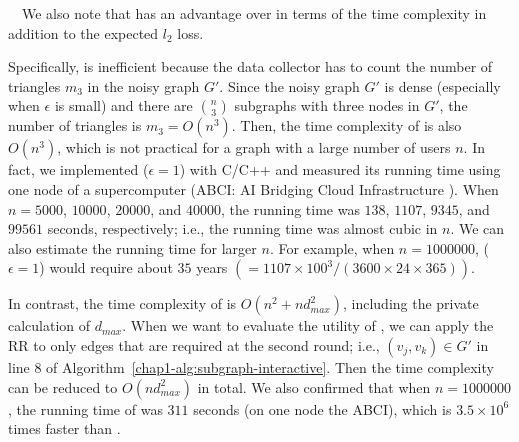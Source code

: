 \smallskip
{}~~We also note that  has an advantage over  in terms of the time complexity in addition to the expected $l_2$ loss. 

Specifically,  is inefficient because the data collector has to count the number of triangles $m_3$ in the noisy graph $G'$. 
Since the noisy graph $G'$ is dense (especially when $\epsilon$ is small) and there are $\binom{n}{3}$ subgraphs with three nodes in $G'$, the number of triangles is $m_3 = O(n^3)$. 
Then, the time complexity of  is 
also $O(n^3)$, which is not practical for a graph with a large number of users $n$.
In fact, we implemented  ($\epsilon=1$) with C/C++ and measured its running time using one node of a supercomputer (ABCI: AI Bridging Cloud Infrastructure \cite{ABCI}). 
When $n=5000$, $10000$, $20000$, and $40000$, the running time was $138$, $1107$, $9345$, and $99561$ seconds, respectively; i.e., the running time was almost cubic in $n$. 
We can also estimate the running time for larger $n$. 
For example, when $n=1000000$,  ($\epsilon=1$) would require about $35$ years $(=1107 \times 100^3 /(3600 \times 24 \times 365))$. 

In contrast, the time complexity of  
is 
$O(n^2 + n d_{max}^2)$, including the private calculation of $d_{max}$. 
When we want to evaluate the utility of , 
we can apply the RR to only edges that are required at the second round; i.e., $(v_j,v_k) \in G'$ in line 8 of Algorithm~\ref{chap1-alg:subgraph-interactive}. 
Then the time complexity 
can be reduced to 
$O(n d_{max}^2)$ in total. 
We also confirmed that 
when $n=1000000$, the running time of  was $311$ seconds (on one node the ABCI), which is $3.5 \times 10^6$ times faster than . 

